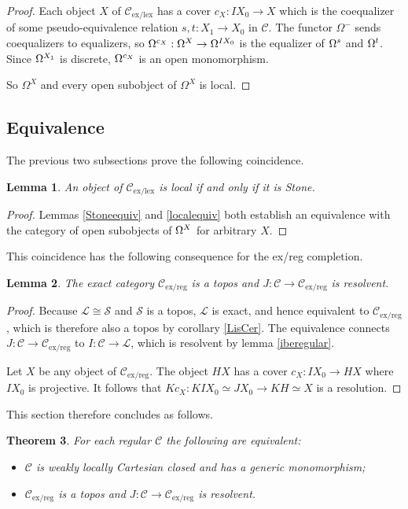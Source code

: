 \documentclass[sort&compress]{elsarticle}
\theoremstyle{plain}
\newtheorem{theorem}{Theorem}
\newtheorem{lemma}[theorem]{Lemma}
\theoremstyle{definition}
\theoremstyle{remark}
\newcommand\cat\mathcal
\newcommand\exlex{_\mathrm{ex/lex}}
\newcommand\exreg{_\mathrm{ex/reg}}
\begin{document}
\begin{proof}
Each object $X$ of $\cat C\exlex$ has a cover $c_X:IX_0\to X$ which is the coequalizer of some pseudo-equivalence relation $s,t:X_1 \to X_0$ in $\cat C$. The functor $\Omega^-$ sends coequalizers to equalizers, so $\Omega^{c_X}:\Omega^{X} \to \Omega^{IX_0}$ is the equalizer of $\Omega^ s$ and $\Omega^ t$. Since $\Omega^ {X_1}$ is discrete, $\Omega^{c_X}$ is an open monomorphism.

So $\Omega^X$ and every open subobject of $\Omega^X$ is local.
\end{proof}

\subsection{Equivalence}
The previous two subsections prove the following coincidence.

\begin{lemma} An object of $\cat C\exlex$ is local if and only if it is Stone. \end{lemma}

\begin{proof} Lemmas \ref{Stoneequiv} and \ref{localequiv} both establish an equivalence with the category of open subobjects of $\Omega^{X}$ for arbitrary $X$. \end{proof}

This coincidence has the following consequence for the ex/reg completion.

\begin{lemma} The exact category $\cat C\exreg$ is a topos and $J:\cat C \to \cat C\exreg$ is resolvent. \end{lemma}

\begin{proof} Because $\cat L\cong \cat S$ and $\cat S$ is a topos, $\cat L$ is exact, and hence equivalent to $\cat C\exreg$, which is therefore also a topos by corollary \ref{LisCer}. The equivalence connects $J:\cat C \to\cat C\exreg$ to $I:\cat C \to \cat L$, which is resolvent by lemma \ref{iberegular}.

Let $X$ be any object of $\cat C\exreg$. The object $HX$ has a cover $c_X:IX_0 \to HX$ where $IX_0$ is projective. It follows that $Kc_X: KIX_0\simeq JX_0\to KH\simeq X$ is a resolution. 
\end{proof}

This section therefore concludes as follows.

\begin{theorem} For each regular $\cat C$ the following are equivalent:
\begin{itemize}
\item $\cat C$ is weakly locally Cartesian closed and has a generic monomorphism;
\item $\cat C\exreg$ is a topos and $J:\cat C \to\cat C\exreg$ is resolvent.
\end{itemize}\label{ThB}
\end{theorem}
\end{document}
